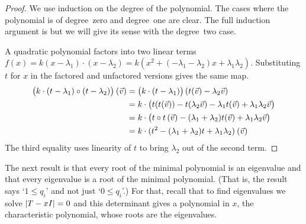 \begin{proof}
We use induction on the degree of the polynomial.
The cases where the polynomial is of
degree~zero and degree~one are clear.
The full induction argument is 
but we will give its sense with the degree~two case.

A quadratic polynomial factors into two
linear terms \( f(x)=k(x-\lambda_1)\cdot(x-\lambda_2)
                    =k(x^2+(-\lambda_1-\lambda_2)x+\lambda_1\lambda_2) \).
Substituting \( t \) 
for \( x \) in the factored and
unfactored versions gives the same map.
\begin{align*}
   \bigl(k\cdot(t-\lambda_1)\mathbin{\circ} (t-\lambda_2)\bigr)\>(\vec{v})
   &=\bigl(k\cdot(t-\lambda_1)\bigr)\,(t(\vec{v})-\lambda_2\vec{v})    \\
   &=k\cdot\bigl(t(t(\vec{v}))-t(\lambda_2\vec{v})
      -\lambda_1 t(\vec{v})+\lambda_1\lambda_2\vec{v}\bigr)    \\
   &=k\cdot \bigl(t\mathbin{\circ} t\,(\vec{v})-(\lambda_1+\lambda_2)t(\vec{v})
          +\lambda_1\lambda_2\vec{v}\bigr)                    \\
   &=k\cdot(t^2-(\lambda_1+\lambda_2)t+\lambda_1\lambda_2)\>(\vec{v})
\end{align*}
The third equality uses linearity of \( t \) to bring $\lambda_2$ out of the
second term.
\end{proof}


The next result is that
every root of the minimal polynomial is an eigenvalue and
that every eigenvalue is a root of the minimal polynomial. 
(That is, the result says `$1\leq q_i$' and 
not just `$0\leq q_i$'.)
For that, recall that to find eigenvalues
we solve $\deter{T-xI}=0$ and 
this determinant gives a polynomial in $x$, 
the characteristic polynomial, 
whose roots are the eigenvalues.

